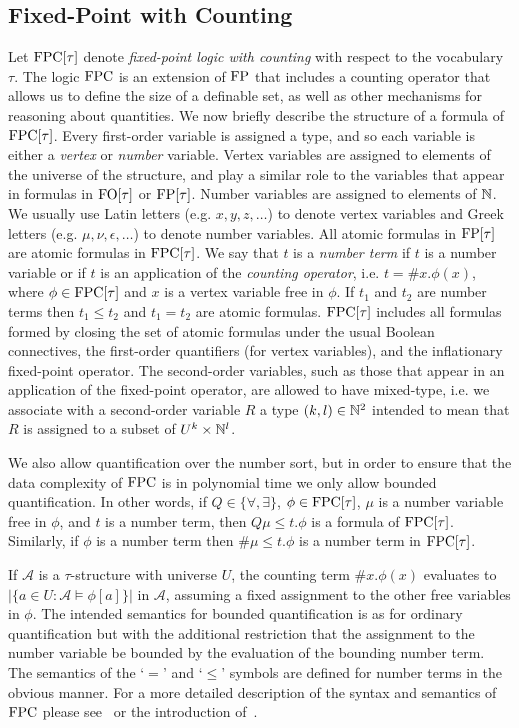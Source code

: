 \documentclass[../paper.tex]{subfiles}
\begin{document}
\subsection{Fixed-Point with Counting}
Let $\text{\upshape FPC}[\tau]$ denote \emph{fixed-point logic with counting} with respect to
the vocabulary $\tau$. The logic $\text{\upshape FPC}$ is an extension of $\text{\upshape FP}$ that includes a
counting operator that allows us to define the size of a definable set, as well
as other mechanisms for reasoning about quantities. We now briefly describe the
structure of a formula of $\text{\upshape FPC}[\tau]$. Every first-order variable is assigned a
type, and so each variable is either a \emph{vertex} or \emph{number} variable.
Vertex variables are assigned to elements of the universe of the structure, and
play a similar role to the variables that appear in formulas in $\text{\upshape FO}[\tau]$ or
$\text{\upshape FP}[\tau]$. Number variables are assigned to elements of $\mathbb{N}$. We usually
use Latin letters (e.g. $x, y, z, \ldots$) to denote vertex variables and Greek
letters (e.g. $\mu, \nu, \epsilon, \ldots$) to denote number variables. All
atomic formulas in $\text{\upshape FP}[\tau]$ are atomic formulas in $\text{\upshape FPC}[\tau]$. We say that
$t$ is a \emph{number term} if $t$ is a number variable or if $t$ is an application
of the \emph{counting operator}, i.e. $t = \#x. \phi(x)$, where $\phi \in
\text{\upshape FPC}[\tau]$ and $x$ is a vertex variable free in $\phi$. If $t_1$ and $t_2$ are
number terms then $t_1 \leq t_2$ and $t_1 = t_2$ are atomic formulas.
$\text{\upshape FPC}[\tau]$ includes all formulas formed by closing the set of atomic formulas
under the usual Boolean connectives, the first-order quantifiers (for vertex
variables), and the inflationary fixed-point operator. The second-order
variables, such as those that appear in an application of the fixed-point
operator, are allowed to have mixed-type, i.e. we associate with a second-order
variable $R$ a type $(k, l) \in \mathbb{N}^2$ intended to mean that $R$ is assigned
to a subset of $U^k \times \mathbb{N}^l$.

We also allow quantification over the number sort, but in order to ensure that
the data complexity of $\text{\upshape FPC}$ is in polynomial time we only allow bounded
quantification. In other words, if $Q \in \{\forall, \exists \}$, $\phi \in
\text{\upshape FPC}[\tau]$, $\mu$ is a number variable free in $\phi$, and $t$ is a number
term, then $Q \mu \leq t . \phi$ is a formula of $\text{\upshape FPC}[\tau]$. Similarly, if
$\phi$ is a number term then $\# \mu \leq t .\phi$ is a number term in
$\text{\upshape FPC}[\tau]$.

If $\mathcal{A}$ is a $\tau$-structure with universe $U$, the counting term
$\#x. \phi(x)$ evaluates to $\vert \{a \in U : \mathcal{A} \models \phi[a]\}
\vert$ in $\mathcal{A}$, assuming a fixed assignment to the other free variables
in $\phi$. The intended semantics for bounded quantification is as for ordinary
quantification but with the additional restriction that the assignment to the
number variable be bounded by the evaluation of the bounding number term. The
semantics of the `$=$' and `$\leq$' symbols are defined for number terms in the
obvious manner. For a more detailed description of the syntax and semantics of
$\text{\upshape FPC}$ please see~\cite{grohe2017descriptive} or the introduction
of~\cite{GradelP15a}.
\end{document}
